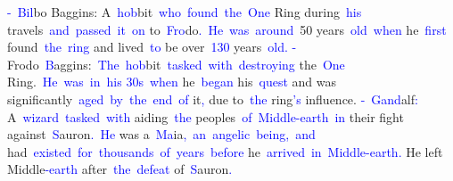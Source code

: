 \documentclass{article}
\begin{document}
\begin{tcolorbox}[colframe=black,colback=white]
\textcolor{blue}{-}\textcolor{blue}{~Bil}bo Baggins: A\textcolor{blue}{~hob}bit\textcolor{blue}{~who}\textcolor{blue}{~found}\textcolor{blue}{~the}\textcolor{blue}{~One} Ring during\textcolor{blue}{~his} travels\textcolor{blue}{~and}\textcolor{blue}{~passed}\textcolor{blue}{~it}\textcolor{blue}{~on} to\textcolor{blue}{~Fro}do\textcolor{blue}{.}\textcolor{blue}{~He}\textcolor{blue}{~was}\textcolor{blue}{~around}\textcolor{blue}{~}50 years\textcolor{blue}{~old}\textcolor{blue}{~when} he\textcolor{blue}{~first} found\textcolor{blue}{~the}\textcolor{blue}{~ring} and lived\textcolor{blue}{~to} be over\textcolor{blue}{~}\textcolor{blue}{130} years\textcolor{blue}{~old}\textcolor{blue}{.
}\textcolor{blue}{-} Frodo\textcolor{blue}{~B}aggins:\textcolor{blue}{~The}\textcolor{blue}{~hob}bit\textcolor{blue}{~tasked}\textcolor{blue}{~with}\textcolor{blue}{~destroying} the\textcolor{blue}{~One} Ring.\textcolor{blue}{~He}\textcolor{blue}{~was}\textcolor{blue}{~in}\textcolor{blue}{~his} \textcolor{blue}{30}\textcolor{blue}{s}\textcolor{blue}{~when} he\textcolor{blue}{~began} his\textcolor{blue}{~quest} and was significantly\textcolor{blue}{~aged}\textcolor{blue}{~by}\textcolor{blue}{~the}\textcolor{blue}{~end}\textcolor{blue}{~of} it\textcolor{blue}{,} due to\textcolor{blue}{~the} ring\textcolor{blue}{'s} influence.
\textcolor{blue}{-}\textcolor{blue}{~Gand}alf\textcolor{blue}{:} A\textcolor{blue}{~wizard}\textcolor{blue}{~tasked}\textcolor{blue}{~with} aiding\textcolor{blue}{~the} peoples\textcolor{blue}{~of}\textcolor{blue}{~Middle}\textcolor{blue}{-earth}\textcolor{blue}{~in} their fight against\textcolor{blue}{~S}auron\textcolor{blue}{.}\textcolor{blue}{~He} was a\textcolor{blue}{~Ma}ia\textcolor{blue}{,}\textcolor{blue}{~an}\textcolor{blue}{~angel}\textcolor{blue}{ic}\textcolor{blue}{~being}\textcolor{blue}{,}\textcolor{blue}{~and} had\textcolor{blue}{~existed}\textcolor{blue}{~for}\textcolor{blue}{~thousands}\textcolor{blue}{~of}\textcolor{blue}{~years}\textcolor{blue}{~before} he\textcolor{blue}{~arrived}\textcolor{blue}{~in}\textcolor{blue}{~Middle}\textcolor{blue}{-earth}\textcolor{blue}{.} He left Middle\textcolor{blue}{-earth} after\textcolor{blue}{~the}\textcolor{blue}{~defeat} of\textcolor{blue}{~S}auron\textcolor{blue}{.}\textcolor{blue}{~

}
\end{tcolorbox}
\end{document}
